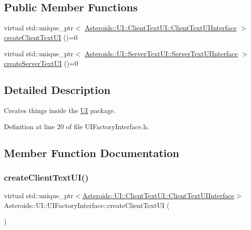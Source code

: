 \subsection*{Public Member Functions}
\begin{DoxyCompactItemize}
\item 
virtual std\+::unique\+\_\+ptr$<$ \hyperlink{classAsteroids_1_1UI_1_1ClientTextUI_1_1ClientTextUIInterface}{Asteroids\+::\+U\+I\+::\+Client\+Text\+U\+I\+::\+Client\+Text\+U\+I\+Interface} $>$ \hyperlink{classAsteroids_1_1UI_1_1UIFactoryInterface_a6133ee6b7552c1f218df3e51aed91c74}{create\+Client\+Text\+UI} ()=0
\item 
virtual std\+::unique\+\_\+ptr$<$ \hyperlink{classAsteroids_1_1UI_1_1ServerTextUI_1_1ServerTextUIInterface}{Asteroids\+::\+U\+I\+::\+Server\+Text\+U\+I\+::\+Server\+Text\+U\+I\+Interface} $>$ \hyperlink{classAsteroids_1_1UI_1_1UIFactoryInterface_a830fa72105e7f123146383330f2fa8b9}{create\+Server\+Text\+UI} ()=0
\end{DoxyCompactItemize}


\subsection{Detailed Description}
Creates things inside the \hyperlink{namespaceAsteroids_1_1UI}{UI} package. 

Definition at line 20 of file U\+I\+Factory\+Interface.\+h.



\subsection{Member Function Documentation}
\mbox{\label{classAsteroids_1_1UI_1_1UIFactoryInterface_a6133ee6b7552c1f218df3e51aed91c74}} 
\subsubsection{\texorpdfstring{create\+Client\+Text\+U\+I()}{createClientTextUI()}}
{\footnotesize\ttfamily virtual std\+::unique\+\_\+ptr$<$\hyperlink{classAsteroids_1_1UI_1_1ClientTextUI_1_1ClientTextUIInterface}{Asteroids\+::\+U\+I\+::\+Client\+Text\+U\+I\+::\+Client\+Text\+U\+I\+Interface}$>$ Asteroids\+::\+U\+I\+::\+U\+I\+Factory\+Interface\+::create\+Client\+Text\+UI (\begin{DoxyParamCaption}{ }\end{DoxyParamCaption})\hspace{0.3cm}{\ttfamily [pure virtual]}}



